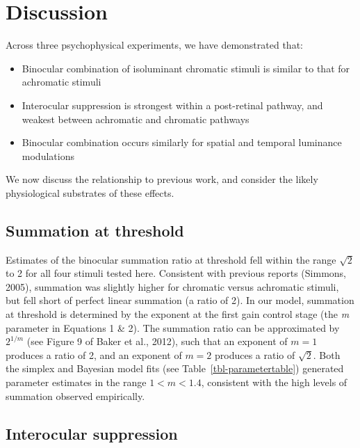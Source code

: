 \documentclass[
  letterpaper,
  DIV=11,
  numbers=noendperiod]{scrartcl}
\providecommand{\tightlist}{%
  \setlength{\itemsep}{0pt}\setlength{\parskip}{0pt}}\usepackage{longtable,booktabs,array}
\begin{document}
\hypertarget{discussion}{%
\section{Discussion}\label{discussion}}

Across three psychophysical experiments, we have demonstrated that:

\begin{itemize}
\tightlist
\item
  Binocular combination of isoluminant chromatic stimuli is similar to
  that for achromatic stimuli
\item
  Interocular suppression is strongest within a post-retinal pathway,
  and weakest between achromatic and chromatic pathways
\item
  Binocular combination occurs similarly for spatial and temporal
  luminance modulations
\end{itemize}

We now discuss the relationship to previous work, and consider the
likely physiological substrates of these effects.

\hypertarget{summation-at-threshold}{%
\subsection{Summation at threshold}\label{summation-at-threshold}}

Estimates of the binocular summation ratio at threshold fell within the
range \(\sqrt{2}\) to 2 for all four stimuli tested here. Consistent
with previous reports (Simmons, 2005), summation was slightly higher for
chromatic versus achromatic stimuli, but fell short of perfect linear
summation (a ratio of 2). In our model, summation at threshold is
determined by the exponent at the first gain control stage (the \emph{m}
parameter in Equations 1 \& 2). The summation ratio can be approximated
by \(2^{1/m}\) (see Figure 9 of Baker et al., 2012), such that an
exponent of \(m=1\) produces a ratio of 2, and an exponent of \(m = 2\)
produces a ratio of \(\sqrt{2}\). Both the simplex and Bayesian model
fits (see Table~\ref{tbl-parametertable}) generated parameter estimates
in the range \(1 < m < 1.4\), consistent with the high levels of
summation observed empirically.

\hypertarget{interocular-suppression}{%
\subsection{Interocular suppression}\label{interocular-suppression}}
\end{document}
